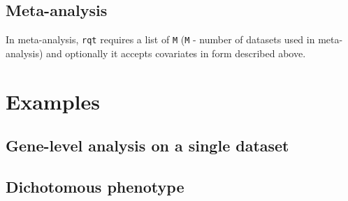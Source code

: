 \documentclass{article}
\begin{document}
\subsection{Meta-analysis}
In meta-analysis, \texttt{rqt} requires a list of \texttt{M} 
(\texttt{M} - number 
of datasets used in meta-analysis) and optionally it accepts
covariates in form described above.

\section{Examples}

\subsection{Gene-level analysis on a single dataset}
\subsection{Dichotomous phenotype}
\end{document}
